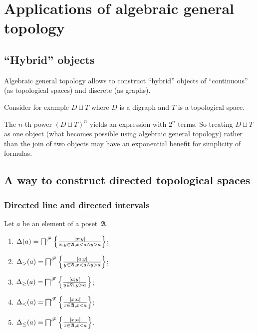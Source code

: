 \chapter{Applications of algebraic general topology}


\section{``Hybrid'' objects}

Algebraic general topology allows to construct ``hybrid'' objects of ``continuous'' (as topological spaces)
and discrete (as graphs).

Consider for example $D\sqcup T$ where $D$ is a digraph and $T$ is a topological space.

The $n$-th power $(D\sqcup T)^n$ yields an expression with $2^n$ terms.
So treating $D\sqcup T$ as one object (what becomes possible using algebraic general topology)
rather than the join of two objects may have an exponential benefit for simplicity of formulas.

\section{A way to construct directed topological spaces}

\subsection{Directed line and directed intervals}

\begin{defn}
Let $a$ be an element of a poset~$\mathfrak{A}$.
\begin{enumerate}
\item $\Delta(a) = \bigsqcap^{\mathscr{F}} \left\{ \frac{]x;y[}{x,y\in\mathfrak{A}, x<a\land y>a}\right\}$;
\item $\Delta_{>}(a) = \bigsqcap^{\mathscr{F}} \left\{ \frac{]a;y[}{y\in\mathfrak{A}, x<a\land y>a}\right\}$;
\item $\Delta_{\geq}(a) = \bigsqcap^{\mathscr{F}} \left\{ \frac{[a;y[}{y\in\mathfrak{A}, y>a}\right\}$;
\item $\Delta_{<}(a) = \bigsqcap^{\mathscr{F}} \left\{ \frac{]x;a[}{x\in\mathfrak{A}, x<a}\right\}$;
\item $\Delta_{\leq}(a) = \bigsqcap^{\mathscr{F}} \left\{ \frac{]x;a]}{x\in\mathfrak{A}, x<a}\right\}$.
\end{enumerate}
\end{defn}

